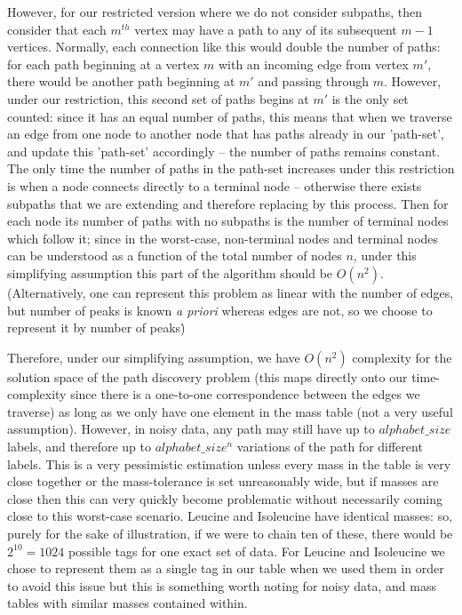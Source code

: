 \documentclass{l4proj}
\begin{document}
However, for our restricted version where we do not consider subpaths, then consider that each \(m^{th}\) vertex may have a path to any of its subsequent \(m-1\) vertices. Normally, each connection like this would double the number of paths: for each path beginning at a vertex \(m\) with an incoming edge from vertex \(m'\), there would be another path beginning at \(m'\) and passing through \(m\). However, under our restriction, this second set of paths begins at \(m'\) is the only set counted: since it has an equal number of paths, this means that when we traverse an edge from one node to another node that has paths already in our 'path-set', and update this 'path-set' accordingly -- the number of paths remains constant. The only time the number of paths in the path-set increases under this restriction is when a node connects directly to a terminal node -- otherwise there exists subpaths that we are extending and therefore replacing by this process. Then for each node its number of paths with no subpaths is the number of terminal nodes which follow it; since in the worst-case, non-terminal nodes and terminal nodes can be understood as a function of the total number of nodes \(n\), under this simplifying assumption this part of the algorithm should be \(O(n^2)\). (Alternatively, one can represent this problem as linear with the number of edges, but number of peaks is known \textit{a priori} whereas edges are not, so we choose to represent it by number of peaks\.)

Therefore, under our simplifying assumption, we have \(O(n^2)\) complexity for the solution space of the path discovery problem (this maps directly onto our time-complexity since there is a one-to-one correspondence between the edges we traverse) as long as we only have one element in the mass table (not a very useful assumption). However, in noisy data, any path may still have up to \(alphabet\_size\) labels, and therefore up to \(alphabet\_size^n\) variations of the path for different labels. This is a very pessimistic estimation unless every mass in the table is very close together or the mass-tolerance is set unreasonably wide, but if masses are close then this can very quickly become problematic without necessarily coming close to this worst-case scenario. Leucine and Isoleucine have identical masses: so, purely for the sake of illustration, if we were to chain ten of these, there would be \(2^{10} = 1024\) possible tags for one exact set of data. For Leucine and Isoleucine we chose to represent them as a single tag in our table when we used them in order to avoid this issue but this is something worth noting for noisy data, and mass tables with similar masses contained within.
\end{document}
